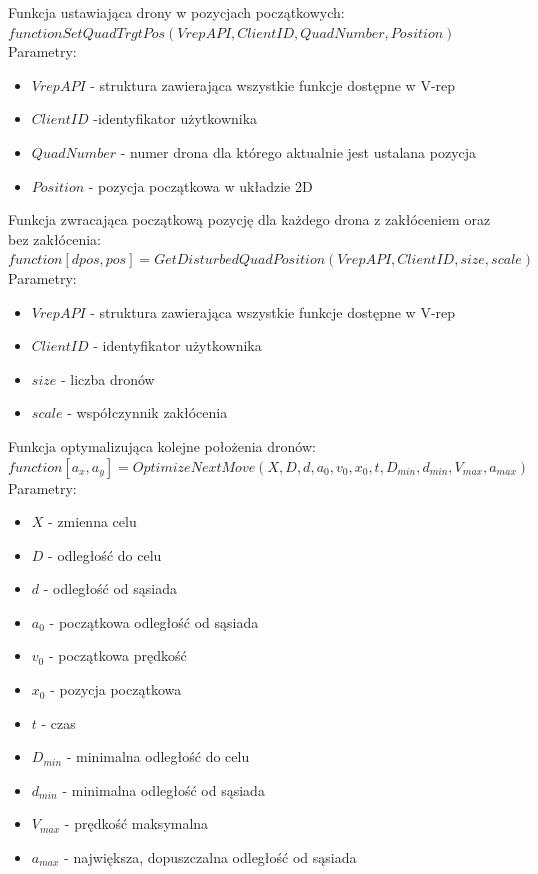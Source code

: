 \documentclass[a4paper, 11pt, oneside]{article}
\begin{document}
Funkcja ustawiająca drony w pozycjach początkowych:
\newline
$function SetQuadTrgtPos(VrepAPI, ClientID, QuadNumber, Position)$
\newline
Parametry:
\begin{itemize}
\item $VrepAPI$ - struktura zawierająca wszystkie funkcje dostępne w V-rep
\item $ClientID$ -identyfikator użytkownika
\item $QuadNumber$ - numer drona dla którego aktualnie jest ustalana pozycja 
\item $Position$ - pozycja początkowa w układzie 2D
\end{itemize}
Funkcja zwracająca początkową pozycję dla każdego drona z zakłóceniem oraz bez zakłócenia:
\newline
$function [dpos, pos]=GetDisturbedQuadPosition(VrepAPI, ClientID, size, scale)$
\newline
Parametry:
\begin{itemize}
\item $VrepAPI$ - struktura zawierająca wszystkie funkcje dostępne w V-rep
\item $ClientID$ - identyfikator użytkownika
\item $size$ - liczba dronów 
\item $scale$ - współczynnik zakłócenia
\end{itemize}

Funkcja optymalizująca kolejne położenia dronów:
\newline
$function [a_x,a_y]=OptimizeNextMove(X,D,d,a_{0},v_{0},x_{0},t,D_{min},d_{min},V_{max},a_{max})$
\newline
Parametry:
\begin{itemize}
\item $X$ - zmienna celu
\item $D$ - odległość do celu
\item $d$ -  odległość od sąsiada
\item $a_{0}$ - początkowa odległość od sąsiada
\item $v_{0}$ - początkowa prędkość
\item $x_{0}$ - pozycja początkowa
\item $t$ -  czas
\item $D_{min}$ - minimalna odległość do celu
\item $d_{min}$ - minimalna odległość od sąsiada
\item $V_{max}$ - prędkość maksymalna
\item $a_{max}$ - największa, dopuszczalna odległość od sąsiada 
\end{itemize}
\end{document}
